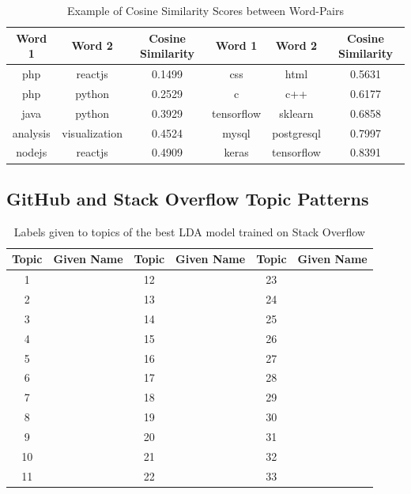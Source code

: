         \begin{table}
              \centering
              \caption{Example of Cosine Similarity Scores between Word-Pairs} \label{tab:SO_LDA_labels}
                \vspace{6pt} %
              \begin{tabular}{|c c c|c c c|}
                \hline
                Word 1 & Word 2 & Cosine Similarity & Word 1 & Word 2 & Cosine Similarity \\
                \hline
                php & reactjs & 0.1499 & css & html & 0.5631 \\
                php & python & 0.2529 & c & c++ & 0.6177 \\
                java & python & 0.3929 & tensorflow & sklearn & 0.6858 \\ 
                analysis & visualization & 0.4524 & mysql & postgresql & 0.7997 \\
                nodejs & reactjs & 0.4909 & keras & tensorflow & 0.8391 \\
                \hline
              \end{tabular}
            \end{table}
        
        \subsection{GitHub and Stack Overflow Topic Patterns}
            
            \begin{table}
              \centering
              \caption{Labels given to topics of the best LDA model trained on Stack Overflow}\label{tab:SO_LDA_labels}
                \vspace{6pt} %
              \begin{tabular}{|c|c|c|c|c|c|}
                \hline
                Topic & Given Name & Topic & Given Name & Topic & Given Name \\
                \hline
                1 & & 12 & & 23 &  \\
                2 & & 13 & & 24 &  \\
                3 & & 14 & & 25 &  \\
                4 & & 15 & & 26 &  \\
                5 & & 16 & & 27 &  \\
                6 & & 17 & & 28 &  \\
                7 & & 18 & & 29 &  \\
                8 & & 19 & & 30 &  \\
                9 & & 20 & & 31 &  \\
                10 & & 21 & & 32 &  \\
                11 & & 22 & & 33 &  \\
                \hline
              \end{tabular}
            \end{table}
            
